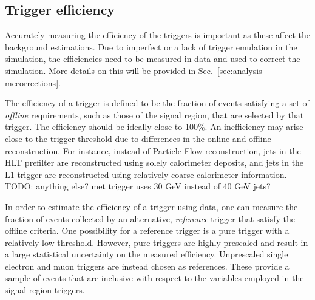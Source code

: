 

\subsection{Trigger efficiency}

Accurately measuring the efficiency of the triggers is important as these 
affect the background estimations. Due to imperfect or a lack of trigger 
emulation in the simulation, the efficiencies need to be measured in data and 
used to correct the simulation. More details on this will be provided in 
Sec.~\ref{sec:analysis-mccorrections}. 

The efficiency of a trigger is defined to be the fraction of events satisfying 
a set of \textit{offline} requirements, such as those of the signal region, 
that are selected by that trigger. The efficiency should be ideally close to 
100\%. An inefficiency may arise close to the trigger threshold due to 
differences in the online and offline reconstruction. For instance, instead of 
Particle Flow reconstruction, jets in the HLT prefilter are reconstructed using 
solely calorimeter deposits, and jets in the L1 trigger are reconstructed using 
relatively coarse calorimeter information.
TODO: anything else? met trigger uses 30 GeV instead of 40 GeV jets?

In order to estimate the efficiency of a trigger using data, one can 
measure the fraction of events collected by an alternative, \textit{reference} 
trigger that satisfy the offline criteria. One possibility for a reference 
trigger is a pure \scalht trigger with a relatively low threshold. However, 
pure \scalht triggers are highly prescaled and result in a large statistical 
uncertainty on the measured efficiency. Unprescaled single electron and muon 
triggers are instead chosen as references. These provide a sample of events 
that are inclusive with respect to the variables employed in the signal region 
triggers.

